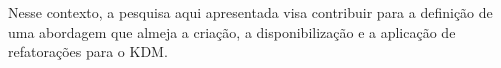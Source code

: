 Nesse contexto, a pesquisa aqui apresentada visa contribuir para a definição de uma abordagem que almeja a criação, a disponibilização e a aplicação de refatorações para o KDM.


%


    
    
